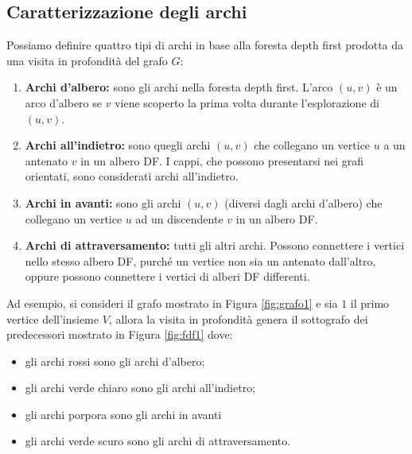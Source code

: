 \subsection{Caratterizzazione degli archi}
Possiamo definire quattro tipi di archi in base alla foresta depth first prodotta da una visita in profondità del grafo $G$:
\begin{enumerate}
	\item \textbf{Archi d'albero:} sono gli archi nella foresta depth first. L'arco $(u,v)$ è un arco d'albero se $v$ viene scoperto la prima volta durante l'esplorazione di $(u,v)$.
	\item \textbf{Archi all'indietro:} sono quegli archi $(u,v)$ che collegano un vertice $u$ a un antenato $v$ in un albero DF. I cappi, che possono presentarsi nei grafi orientati, sono considerati archi all'indietro.
	\item \textbf{Archi in avanti:} sono gli archi $(u,v)$ (diversi dagli archi d'albero) che collegano un vertice $u$ ad un discendente $v$ in un albero DF.
	\item \textbf{Archi di attraversamento:} tutti gli altri archi. Possono connettere i vertici nello stesso albero DF, purché un vertice non sia un antenato dall'altro, oppure possono connettere i vertici di alberi DF differenti.
\end{enumerate}

Ad esempio, si consideri il  grafo mostrato in Figura \ref{fig:grafo1} e sia $1$ il primo vertice dell'insieme $V$, allora la visita in profondità genera il sottografo dei predecessori mostrato in Figura \ref{fig:fdf1} dove:
\begin{itemize}
	\item gli archi rossi sono gli archi d'albero;
	\item gli archi verde chiaro sono gli archi all'indietro;
	\item gli archi porpora sono gli archi in avanti
	\item gli archi verde scuro sono gli archi di attraversamento.
\end{itemize}


